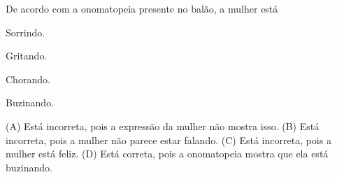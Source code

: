 
De acordo com a onomatopeia presente no balão, a mulher está

\begin{minipage}{.5\textwidth}
\begin{escolha}
\item Sorrindo.

\item Gritando.

\item Chorando.

\item Buzinando.
\end{escolha}
\end{minipage}

(A) Está incorreta, pois a expressão da mulher não mostra isso.
(B) Está incorreta, pois a mulher não parece estar falando.
(C) Está incorreta, pois a mulher está feliz.
(D) Está correta, pois a onomatopeia mostra que ela está buzinando.


